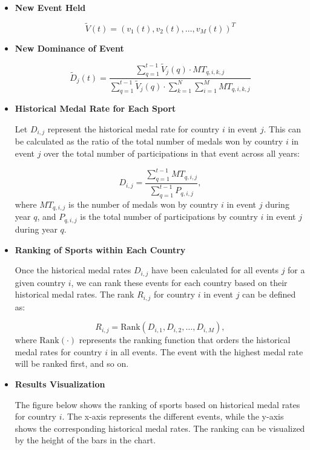 \documentclass{mcmthesis}
\begin{document}
\begin{itemize}[leftmargin=0.15in, labelsep=0.1in, itemsep=1pt, parsep=0pt]
	\item \textbf{New Event Held}
	
	\[
	\tilde{V}(t) = \left( v_1(t), v_2(t), \dots, v_M(t) \right)^T
	\]
	
	\item \textbf{New Dominance of Event}
	
	\[
	\tilde{D}_j(t) = \frac{\sum_{q=1}^{t-1} \tilde{V}_j(q) \cdot MT_{q,i,k,j}}{\sum_{q=1}^{t-1} \tilde{V}_j(q) \cdot \sum_{k=1}^{N} \sum_{i=1}^{M} MT_{q,i,k,j}}
	\]
	
	\item \textbf{Historical Medal Rate for Each Sport}
	
	Let \( D_{i,j} \) represent the historical medal rate for country \( i \) in event \( j \). This can be calculated as the ratio of the total number of medals won by country \( i \) in event \( j \) over the total number of participations in that event across all years:
	
	\[
	D_{i,j} = \frac{\sum_{q=1}^{t-1} MT_{q,i,j}}{\sum_{q=1}^{t-1} P_{q,i,j}},
	\]
	where \( MT_{q,i,j} \) is the number of medals won by country \( i \) in event \( j \) during year \( q \), and \( P_{q,i,j} \) is the total number of participations by country \( i \) in event \( j \) during year \( q \).
	
	\item \textbf{Ranking of Sports within Each Country}
	
	Once the historical medal rates \( D_{i,j} \) have been calculated for all events \( j \) for a given country \( i \), we can rank these events for each country based on their historical medal rates. The rank \( R_{i,j} \) for country \( i \) in event \( j \) can be defined as:
	
	\[
	R_{i,j} = \text{Rank}(D_{i,1}, D_{i,2}, \dots, D_{i,M}),
	\]
	where \( \text{Rank}(\cdot) \) represents the ranking function that orders the historical medal rates for country \( i \) in all events. The event with the highest medal rate will be ranked first, and so on.
	
	\item \textbf{Results Visualization}
	
	The figure below shows the ranking of sports based on historical medal rates for country \( i \). The x-axis represents the different events, while the y-axis shows the corresponding historical medal rates. The ranking can be visualized by the height of the bars in the chart.
	

\end{itemize}
\end{document}
